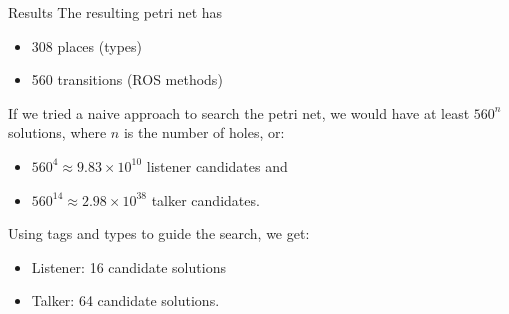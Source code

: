 \documentclass[final]{beamer}
\newlength{\onecolwid}
\begin{document}
\begin{frame}[t]
\begin{columns}[t]
\begin{column}{\onecolwid}
\begin{block}{Results}
The resulting petri net has 
\begin{itemize}
\item 308 places (types)
\item 560 transitions (ROS methods)
\end{itemize}

If we tried a naive approach to search the petri net, we would have at least $560^n$ solutions, where $n$ is the number of holes, or:
\begin{itemize}
\item $560^{4} \approx 9.83 \times 10^{10}$ listener candidates and
\item $560^{14} \approx 2.98 \times 10^{38}$ talker candidates.
\end{itemize}

Using tags and types to guide the search, we get:
\begin{itemize}
\item Listener: 16 candidate solutions
\item Talker: 64 candidate solutions.
\end{itemize}
\end{block}








\end{column}
\end{columns}
\end{frame}
\end{document}
